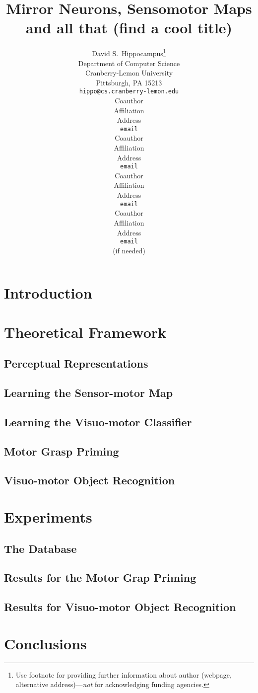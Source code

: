 \documentclass{article}
\title{Mirror Neurons, Sensomotor Maps and all that (find a cool title)}
\author{
David S.~Hippocampus\thanks{ Use footnote for providing further information
about author (webpage, alternative address)---\emph{not} for acknowledging
funding agencies.} \\
Department of Computer Science\\
Cranberry-Lemon University\\
Pittsburgh, PA 15213 \\
\texttt{hippo@cs.cranberry-lemon.edu} \\
\And
Coauthor \\
Affiliation \\
Address \\
\texttt{email} \\
\AND
Coauthor \\
Affiliation \\
Address \\
\texttt{email} \\
\And
Coauthor \\
Affiliation \\
Address \\
\texttt{email} \\
\And
Coauthor \\
Affiliation \\
Address \\
\texttt{email} \\
(if needed)\\
}
\begin{document}
\makeanontitle

\begin{abstract}

\end{abstract}

\section{Introduction}


\label{sec:intro}

\section{Theoretical Framework}
\label{sec::framework}


\subsection{Perceptual Representations}
\label{sec:2.1}


\subsection{Learning the Sensor-motor Map}
\label{sec:2.2}


\subsection{Learning the Visuo-motor Classifier}
\label{sec:2.3}


\subsection{Motor Grasp Priming}
\label{sec:2.4}


\subsection{Visuo-motor Object Recognition}
\label{sec:2.5}


\section{Experiments}
\label{exper}


\subsection{The Database}
\label{sec:3.1}


\subsection{Results for the Motor Grap Priming}
\label{sec:3.2}


\subsection{Results for Visuo-motor Object Recognition}
\label{sec:3.3}


\section{Conclusions}



\end{document}
